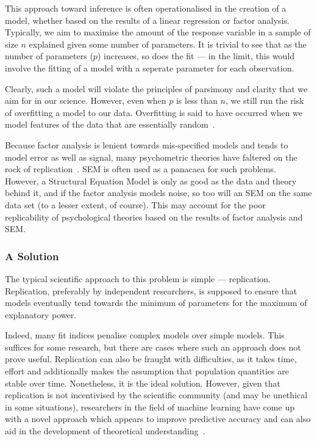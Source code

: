 This approach toward inference is often operationalised in the creation of a model, whether based on the results of a linear regression or factor analysis. Typically, we aim to maximise the amount of the response variable  in a sample of size $n$ explained given some number of parameters. It is trivial to see that as the number of parameters ($p$) increases, so does the fit --- in the limit, this would involve the fitting of a model with a seperate parameter for each observation. 

Clearly, such a model will violate the principles of parsimony and clarity that we aim for in our science. However, even when $p$ is less than $n$, we still run the risk of overfitting a model to our data. Overfitting is said to have occurred when we model features of the data that are essentially random~\cite{friedman2009elements}. 

Because factor analysis is lenient towards mis-specified models and tends to model error as well as signal, many psychometric theories have faltered on the rock of replication~\cite{fabrigar1999evaluating}. SEM is often used as a panacaea for such problems. However, a Structural Equation Model is only as good as the data and theory behind it, and if the factor analysis models noise, so too will an SEM on the same data set (to a lesser extent, of course). This may account for the poor replicability of psychological theories based on the results of factor analysis and SEM.\@

\subsubsection{A Solution}

The typical scientific approach to this problem is simple --- replication. Replication, preferably by independent researchers, is supposed to ensure that models eventually tend towards the minimum of parameters for the maximum of explanatory power.

Indeed, many fit indices penalise complex models over simple models. This suffices for some research, but there are cases where such an approach does not prove useful. Replication can also be fraught with difficulties, as it takes time, effort and additionally makes the assumption that population quantities are stable over time. Nonetheless, it is the ideal solution. However, given that replication is not incentivised by the scientific community (and may be unethical in some situations), researchers in the field of machine learning have come up with a novel approach which appears to improve predictive accuracy and can also aid in the development of theoretical understanding~\cite{friedman2009elements}.

